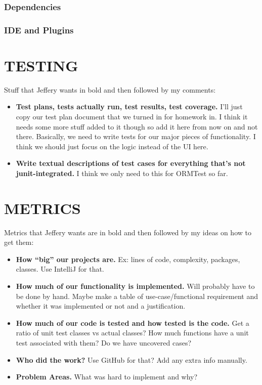 \documentclass[twoside,letterpaper]{article}
\begin{document}
\newpage
\subsubsection{Dependencies}


\newpage
\subsubsection{IDE and Plugins}

\newpage
\section[Testing]{\rmfamily\bfseries\color{black} TESTING}


Stuff that Jeffery wants in bold and then followed by my comments:

\begin{itemize}
	\item \textbf{Test plans, tests actually run, test results, test coverage.} I'll just copy our test plan document that we turned in for homework in. I think it needs some more stuff added to it though so add it here from now on and not there. Basically, we need to write tests for our major pieces of functionality. I think we should just focus on the logic instead of the UI here.
	\item \textbf{Write textual descriptions of test cases for everything that's not junit-integrated.} I think we only need to this for ORMTest so far.
\end{itemize}



\newpage
\section[METRICS]{\rmfamily\bfseries\color{black} METRICS}

Metrics that Jeffery wants are in bold and then followed by my ideas on how to get them:

\begin{itemize}
	\item \textbf{How ``big'' our projects are.} Ex: lines of code, complexity, packages, classes. Use IntelliJ for that.
	\item \textbf{How much of our functionality is implemented.} Will probably have to be done by hand. Maybe make a table of use-case/functional requirement and whether it was implemented or not and a justification.
	\item \textbf{How much of our code is tested and how tested is the code.} Get a ratio of unit test classes vs actual classes? How much functions have a unit test associated with them? Do we have uncovered cases?
	\item \textbf{Who did the work?} Use GitHub for that? Add any extra info manually.
	\item \textbf{Problem Areas.} What was hard to implement and why?
\end{itemize}

\bigskip
\end{document}
